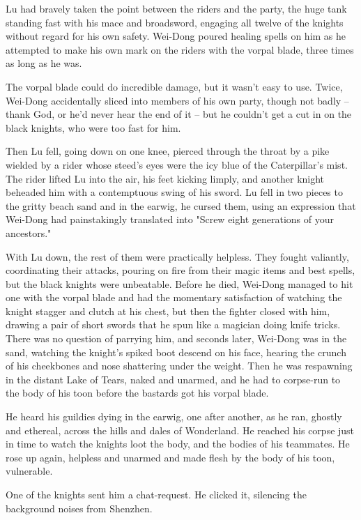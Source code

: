 Lu had bravely taken the point between the riders and the party,
the huge tank standing fast with his mace and broadsword, engaging
all twelve of the knights without regard for his own safety.
Wei-Dong poured healing spells on him as he attempted to make his
own mark on the riders with the vorpal blade, three times as long
as he was.

The vorpal blade could do incredible damage, but it wasn't easy to
use. Twice, Wei-Dong accidentally sliced into members of his own
party, though not badly -- thank God, or he'd never hear the end of
it -- but he couldn't get a cut in on the black knights, who were
too fast for him.

Then Lu fell, going down on one knee, pierced through the throat by
a pike wielded by a rider whose steed's eyes were the icy blue of
the Caterpillar's mist. The rider lifted Lu into the air, his feet
kicking limply, and another knight beheaded him with a contemptuous
swing of his sword. Lu fell in two pieces to the gritty beach sand
and in the earwig, he cursed them, using an expression that
Wei-Dong had painstakingly translated into "Screw eight generations
of your ancestors."

With Lu down, the rest of them were practically helpless. They
fought valiantly, coordinating their attacks, pouring on fire from
their magic items and best spells, but the black knights were
unbeatable. Before he died, Wei-Dong managed to hit one with the
vorpal blade and had the momentary satisfaction of watching the
knight stagger and clutch at his chest, but then the fighter closed
with him, drawing a pair of short swords that he spun like a
magician doing knife tricks. There was no question of parrying him,
and seconds later, Wei-Dong was in the sand, watching the knight's
spiked boot descend on his face, hearing the crunch of his
cheekbones and nose shattering under the weight. Then he was
respawning in the distant Lake of Tears, naked and unarmed, and he
had to corpse-run to the body of his toon before the bastards got
his vorpal blade.

He heard his guildies dying in the earwig, one after another, as he
ran, ghostly and ethereal, across the hills and dales of
Wonderland. He reached his corpse just in time to watch the knights
loot the body, and the bodies of his teammates. He rose up again,
helpless and unarmed and made flesh by the body of his toon,
vulnerable.

One of the knights sent him a chat-request. He clicked it,
silencing the background noises from Shenzhen.

